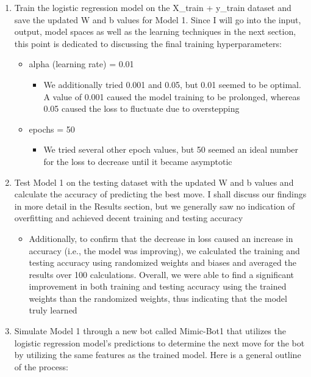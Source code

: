 \documentclass[11pt]{article}
\begin{document}
\begin{enumerate}
    \item Train the logistic regression model on the X\_train + y\_train dataset and save the updated W and b values for Model 1. Since I will go into the input, output, model spaces as well as the learning techniques in the next section, this point is dedicated to discussing the final training hyperparameters:
    \begin{itemize}
        \item alpha (learning rate) = 0.01
        \begin{itemize}
            \item We additionally tried 0.001 and 0.05, but 0.01 seemed to be optimal. A value of 0.001 caused the model training to be prolonged, whereas 0.05 caused the loss to fluctuate due to overstepping
        \end{itemize}
        \item epochs = 50
        \begin{itemize}
            \item We tried several other epoch values, but 50 seemed an ideal number for the loss to decrease until it became asymptotic
        \end{itemize}
    \end{itemize}
    \item Test Model 1 on the testing dataset with the updated W and b values and calculate the accuracy of predicting the best move. I shall discuss our findings in more detail in the Results section, but we generally saw no indication of overfitting and achieved decent training and testing accuracy
    \begin{itemize}
        \item Additionally, to confirm that the decrease in loss caused an increase in accuracy (i.e., the model was improving), we calculated the training and testing accuracy using randomized weights and biases and averaged the results over 100 calculations. Overall, we were able to find a significant improvement in both training and testing accuracy using the trained weights than the randomized weights, thus indicating that the model truly learned
    \end{itemize}
    \item Simulate Model 1 through a new bot called Mimic-Bot1 that utilizes the logistic regression model's predictions to determine the next move for the bot by utilizing the same features as the trained model. Here is a general outline of the process:
    \begin{enumerate}

\end{enumerate}
\end{enumerate}
\end{document}
